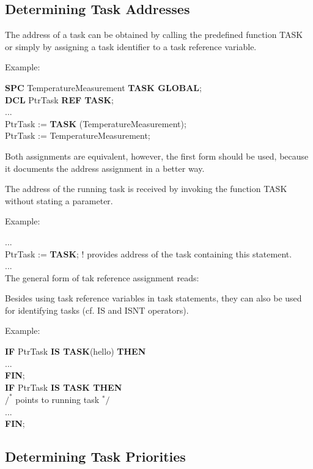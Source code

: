 \subsection{Determining Task Addresses}  %

The address of a task can be obtained by calling the predefined
function TASK or simply by assigning a task identifier to a task
reference variable.

Example:

{\bf SPC} TemperatureMeasurement {\bf TASK GLOBAL};\\
{\bf DCL} PtrTask {\bf REF TASK};\\
...\\
PtrTask := {\bf TASK} (TemperatureMeasurement);\\
PtrTask := TemperatureMeasurement;

Both assignments are equivalent, however, the first form should be used,
because it documents the address assignment in a better way.

The address of the running task is received by invoking the function
TASK without stating a parameter.

Example:

...\\
PtrTask := {\bf TASK}; \x ! provides address of the task containing
this statement.\\
...\\

The general form of tak reference assignment reads:



Besides using task reference variables in task statements, they can
also be used for identifying tasks (cf. IS and ISNT operators).

Example:

{\bf IF} PtrTask {\bf IS TASK}(hello) {\bf THEN}\\
\x \x ...\\
{\bf FIN};\\
{\bf IF} PtrTask {\bf IS TASK THEN}\\
\x \x $/^*$ points to running task $^*/$\\
\x \x ...\\
{\bf FIN};

\subsection{Determining Task Priorities}   %

